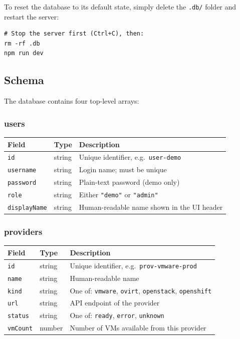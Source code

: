 \documentclass[12pt,a4paper]{article}
\begin{document}
To reset the database to its default state, simply delete the \texttt{.db/} folder and restart the server:

\begin{lstlisting}
# Stop the server first (Ctrl+C), then:
rm -rf .db
npm run dev
\end{lstlisting}

\subsection{Schema}

The database contains four top-level arrays:

\subsubsection{users}

\begin{center}
\begin{tabular}{llL{7cm}}
  \toprule
  \textbf{Field} & \textbf{Type} & \textbf{Description} \\
  \midrule
  \texttt{id}          & string & Unique identifier, e.g.\ \texttt{user-demo} \\
  \texttt{username}    & string & Login name; must be unique \\
  \texttt{password}    & string & Plain-text password (demo only) \\
  \texttt{role}        & string & Either \texttt{"demo"} or \texttt{"admin"} \\
  \texttt{displayName} & string & Human-readable name shown in the UI header \\
  \bottomrule
\end{tabular}
\end{center}

\subsubsection{providers}

\begin{center}
\begin{tabular}{llL{7cm}}
  \toprule
  \textbf{Field} & \textbf{Type} & \textbf{Description} \\
  \midrule
  \texttt{id}       & string & Unique identifier, e.g.\ \texttt{prov-vmware-prod} \\
  \texttt{name}     & string & Human-readable name \\
  \texttt{kind}     & string & One of: \texttt{vmware}, \texttt{ovirt}, \texttt{openstack}, \texttt{openshift} \\
  \texttt{url}      & string & API endpoint of the provider \\
  \texttt{status}   & string & One of: \texttt{ready}, \texttt{error}, \texttt{unknown} \\
  \texttt{vmCount}  & number & Number of VMs available from this provider \\
  \bottomrule
\end{tabular}
\end{center}
\end{document}

